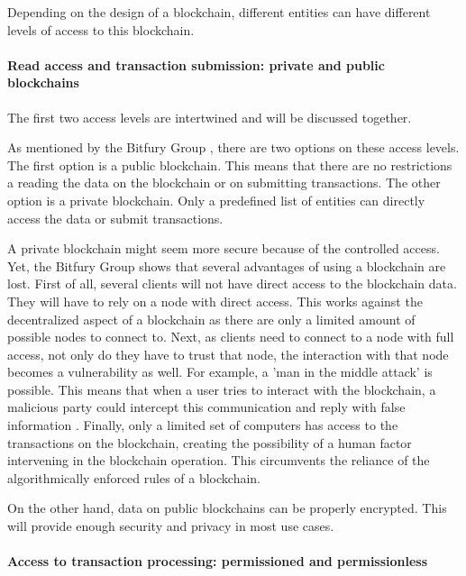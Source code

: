 Depending on the design of a blockchain, different entities can have different levels of access to this blockchain.

\paragraph{Read access and transaction submission: private and public blockchains}

The first two access levels are intertwined and will be discussed together.

As mentioned by the Bitfury Group \cite{bitfury-permissioned}, there are two options on these access levels. The first option is a public blockchain. This means that there are no restrictions a reading the data on the blockchain or on submitting transactions. The other option is a private blockchain. Only a predefined list of entities can directly access the data or submit transactions.

A private blockchain might seem more secure because of the controlled access.  Yet, the Bitfury Group \cite{bitfury-permissioned} shows that several advantages of using a blockchain are lost. First of all, several clients will not have direct access to the blockchain data. They will have to rely on a node with direct access. This works against the decentralized aspect of a blockchain as there are only a limited amount of possible nodes to connect to. Next, as clients need to connect to a node with full access, not only do they have to trust that node, the interaction with that node becomes a vulnerability as well. For example, a 'man in the middle attack' is possible. This means that when a user tries to interact with the blockchain, a malicious party could intercept this communication and reply with false information \cite{man-in-the-middle}. Finally, only a limited set of computers has access to the transactions on the blockchain, creating the possibility of a human factor intervening in the blockchain operation. This circumvents the reliance of the algorithmically enforced rules of a blockchain.

On the other hand, data on public blockchains can be properly encrypted. This will provide enough security and privacy in most use cases.

\paragraph{Access to transaction processing: permissioned and permissionless}

